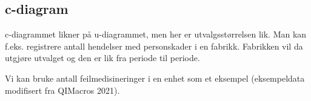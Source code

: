 \documentclass[
]{book}
\begin{document}
\hypertarget{c-diagram}{%
\subsection{c-diagram}\label{c-diagram}}

c-diagrammet likner på u-diagrammet, men her er utvalgsstørrelsen lik. Man kan f.eks. registrere antall hendelser med personskader i en fabrikk. Fabrikken vil da utgjøre utvalget og den er lik fra periode til periode.

Vi kan bruke antall feilmedisineringer i en enhet som et eksempel (eksempeldata modifisert fra QIMacros 2021).

\providecommand{\docline}[3]{\noalign{\global\setlength{\arrayrulewidth}{#1}}\arrayrulecolor[HTML]{#2}\cline{#3}}

\setlength{\tabcolsep}{2pt}

\renewcommand*{\arraystretch}{1.5}
\end{document}
